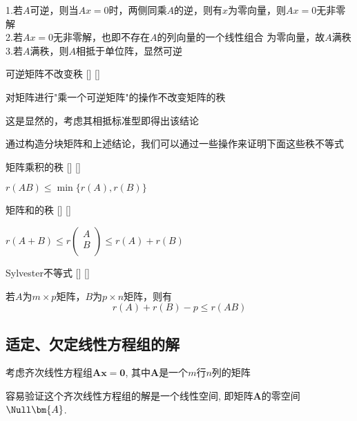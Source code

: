 \documentclass[UTF8]{ctexart}
\begin{document}
        \begin{prf}
            1.若$A$可逆，则当$Ax=0$时，两侧同乘$A$的逆，则有$x$为零向量，则$Ax=0$无非零解\\
            2.若$Ax=0$无非零解，也即不存在$A$的列向量的一个线性组合 为零向量，故$A$满秩\\
            3.若$A$满秩，则$A$相抵于单位阵，显然可逆
        \end{prf}
        
	    \begin{ppt}
			[]
			{可逆矩阵不改变秩}
			[]
			[]

            对矩阵进行"乘一个可逆矩阵"的操作不改变矩阵的秩
        \end{ppt}
        \begin{prf}
            这是显然的，考虑其相抵标准型即得出该结论
        \end{prf}
        通过构造分块矩阵和上述结论，我们可以通过一些操作来证明下面这些秩不等式
        \begin{thm}
			[]
			{矩阵乘积的秩}
			[]
			[]

            $r(AB)\leq \min\{r(A),r(B)\}$
        \end{thm}
        \begin{thm}
			[]
			{矩阵和的秩}
			[]
			[]

            $r(A + B) \leq r\begin{pmatrix} A \\ B \\ \end{pmatrix} \leq r(A) + r(B)$
        \end{thm}

        \begin{thm}
			[]
			{Sylvester不等式}
			[]
			[]
        
            若$A$为$m\times p$矩阵，$B$为$p\times n$矩阵，则有
            \[r(A)+r(B)-p\leq r(AB)\]
        \end{thm}
	\subsection{适定、欠定线性方程组的解}

		考虑齐次线性方程组$\bm{A}\bm{x}=\mathbf{0}$, 其中$\bm{A}$是一个$m$行$n$列的矩阵

		容易验证这个齐次线性方程组的解是一个线性空间, 即矩阵$\bm{A}$的零空间$\Null\bm{A}$. 
\end{document}
